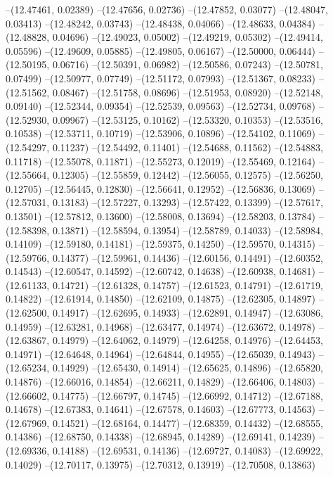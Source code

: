 --(12.47461, 0.02389)
--(12.47656, 0.02736)
--(12.47852, 0.03077)
--(12.48047, 0.03413)
--(12.48242, 0.03743)
--(12.48438, 0.04066)
--(12.48633, 0.04384)
--(12.48828, 0.04696)
--(12.49023, 0.05002)
--(12.49219, 0.05302)
--(12.49414, 0.05596)
--(12.49609, 0.05885)
--(12.49805, 0.06167)
--(12.50000, 0.06444)
--(12.50195, 0.06716)
--(12.50391, 0.06982)
--(12.50586, 0.07243)
--(12.50781, 0.07499)
--(12.50977, 0.07749)
--(12.51172, 0.07993)
--(12.51367, 0.08233)
--(12.51562, 0.08467)
--(12.51758, 0.08696)
--(12.51953, 0.08920)
--(12.52148, 0.09140)
--(12.52344, 0.09354)
--(12.52539, 0.09563)
--(12.52734, 0.09768)
--(12.52930, 0.09967)
--(12.53125, 0.10162)
--(12.53320, 0.10353)
--(12.53516, 0.10538)
--(12.53711, 0.10719)
--(12.53906, 0.10896)
--(12.54102, 0.11069)
--(12.54297, 0.11237)
--(12.54492, 0.11401)
--(12.54688, 0.11562)
--(12.54883, 0.11718)
--(12.55078, 0.11871)
--(12.55273, 0.12019)
--(12.55469, 0.12164)
--(12.55664, 0.12305)
--(12.55859, 0.12442)
--(12.56055, 0.12575)
--(12.56250, 0.12705)
--(12.56445, 0.12830)
--(12.56641, 0.12952)
--(12.56836, 0.13069)
--(12.57031, 0.13183)
--(12.57227, 0.13293)
--(12.57422, 0.13399)
--(12.57617, 0.13501)
--(12.57812, 0.13600)
--(12.58008, 0.13694)
--(12.58203, 0.13784)
--(12.58398, 0.13871)
--(12.58594, 0.13954)
--(12.58789, 0.14033)
--(12.58984, 0.14109)
--(12.59180, 0.14181)
--(12.59375, 0.14250)
--(12.59570, 0.14315)
--(12.59766, 0.14377)
--(12.59961, 0.14436)
--(12.60156, 0.14491)
--(12.60352, 0.14543)
--(12.60547, 0.14592)
--(12.60742, 0.14638)
--(12.60938, 0.14681)
--(12.61133, 0.14721)
--(12.61328, 0.14757)
--(12.61523, 0.14791)
--(12.61719, 0.14822)
--(12.61914, 0.14850)
--(12.62109, 0.14875)
--(12.62305, 0.14897)
--(12.62500, 0.14917)
--(12.62695, 0.14933)
--(12.62891, 0.14947)
--(12.63086, 0.14959)
--(12.63281, 0.14968)
--(12.63477, 0.14974)
--(12.63672, 0.14978)
--(12.63867, 0.14979)
--(12.64062, 0.14979)
--(12.64258, 0.14976)
--(12.64453, 0.14971)
--(12.64648, 0.14964)
--(12.64844, 0.14955)
--(12.65039, 0.14943)
--(12.65234, 0.14929)
--(12.65430, 0.14914)
--(12.65625, 0.14896)
--(12.65820, 0.14876)
--(12.66016, 0.14854)
--(12.66211, 0.14829)
--(12.66406, 0.14803)
--(12.66602, 0.14775)
--(12.66797, 0.14745)
--(12.66992, 0.14712)
--(12.67188, 0.14678)
--(12.67383, 0.14641)
--(12.67578, 0.14603)
--(12.67773, 0.14563)
--(12.67969, 0.14521)
--(12.68164, 0.14477)
--(12.68359, 0.14432)
--(12.68555, 0.14386)
--(12.68750, 0.14338)
--(12.68945, 0.14289)
--(12.69141, 0.14239)
--(12.69336, 0.14188)
--(12.69531, 0.14136)
--(12.69727, 0.14083)
--(12.69922, 0.14029)
--(12.70117, 0.13975)
--(12.70312, 0.13919)
--(12.70508, 0.13863)
